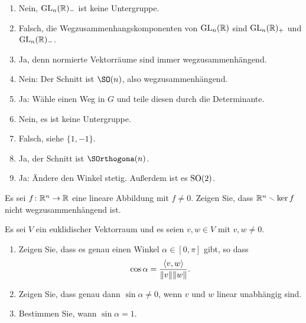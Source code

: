 \begin{solution}
  \begin{enumerate}
    \item
      Nein, $\operatorname{GL}_n(\mathbb{R})_-$ ist keine Untergruppe.
    \item
      Falsch, die Wegzusammenhangskomponenten von $\operatorname{GL}_n(\mathbb{R})$ sind $\operatorname{GL}_n(\mathbb{R})_+$ und $\operatorname{GL}_n(\mathbb{R})_-$.
    \item
      Ja, denn normierte Vektorräume sind immer wegzusammenhängend.
    \item
      Nein: Der Schnitt ist $\SO(n)$, also wegzusammenhängend.
    \item
      Ja: Wähle einen Weg in $G$ und teile diesen durch die Determinante.
    \item
      Nein, es ist keine Untergruppe.
    \item
      Falsch, siehe $\{1,-1\}$.
    \item
      Ja, der Schnitt ist $\SOrthogona(n)$.
    \item
      Ja: Ändere den Winkel stetig.
      Außerdem ist es $\operatorname{SO}(2)$.
  \end{enumerate}
\end{solution}







\begin{question}[subtitle = Zerschneidung von $\Rbb^n$]{2}
  Es sei $f \colon \mathbb{R}^n \to \mathbb{R}$ eine lineare Abbildung mit $f \neq 0$.
  Zeigen Sie, dass $\mathbb{R}^n \smallsetminus \ker f$ nicht wegzusammenhängend ist.
\end{question}


\begin{question}[subtitle = Definition und Sinus des unorientierten Winkels]{2}
  Es sei $V$ ein euklidischer Vektorraum und es seien $v, w \in V$ mit $v, w \neq 0$.
  \begin{enumerate}[leftmargin=*]
    \item
      Zeigen Sie, dass es genau einen Winkel $\alpha \in [0,\pi]$ gibt, so dass
      \[
          \cos \alpha
        = \frac{\left\langle v, w \right\rangle}{\|v\| \|w\|}.
      \]
    \item
      Zeigen Sie, dass genau dann $\sin \alpha \neq 0$, wenn $v$ und $w$ linear unabhängig sind.
    \item
      Bestimmen Sie, wann $\sin \alpha = 1$.
  \end{enumerate}
\end{question}


